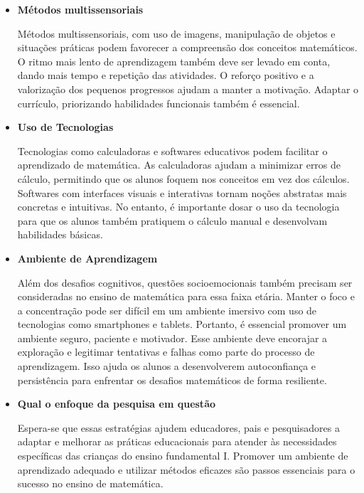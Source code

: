 \begin{itemize}
    \item \textbf{Métodos multissensoriais}

Métodos multissensoriais, com uso de imagens, manipulação de objetos e situações práticas podem favorecer a compreensão dos conceitos matemáticos. O ritmo mais lento de aprendizagem também deve ser levado em conta, dando mais tempo e repetição das atividades. O reforço positivo e a valorização dos pequenos progressos ajudam a manter a motivação. Adaptar o currículo, priorizando habilidades funcionais também é essencial. 

 \item \textbf{Uso de Tecnologias}

 Tecnologias como calculadoras e softwares educativos podem facilitar o aprendizado de matemática. As calculadoras ajudam a minimizar erros de cálculo, permitindo que os alunos foquem nos conceitos em vez dos cálculos. Softwares com interfaces visuais e interativas tornam noções abstratas mais concretas e intuitivas. No entanto, é importante dosar o uso da tecnologia para que os alunos também pratiquem o cálculo manual e desenvolvam habilidades básicas.

\item \textbf{Ambiente de Aprendizagem}

Além dos desafios cognitivos, questões socioemocionais também precisam ser consideradas no ensino de matemática para essa faixa etária. Manter o foco e a concentração pode ser difícil em um ambiente imersivo com uso de tecnologias como smartphones e tablets. Portanto, é essencial promover um ambiente seguro, paciente e motivador. Esse ambiente deve encorajar a exploração e legitimar tentativas e falhas como parte do processo de aprendizagem. Isso ajuda os alunos a desenvolverem autoconfiança e persistência para enfrentar os desafios matemáticos de forma resiliente.

\item \textbf{Qual o enfoque da pesquisa em questão}

Espera-se que essas estratégias ajudem educadores, pais e pesquisadores a adaptar e melhorar as práticas educacionais para atender às necessidades específicas das crianças do ensino fundamental I. Promover um ambiente de aprendizado adequado e utilizar métodos eficazes são passos essenciais para o sucesso no ensino de matemática. 

\end{itemize}












